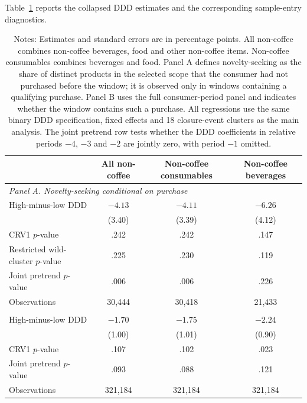 \documentclass[11 pt]{article}
\newcommand\fnote[1]{\captionsetup{font=footnotesize}\caption*{#1}}
\begin{document}
Table~\ref{tab:appendix_noncoffee_novelty} reports the collapsed DDD estimates and the corresponding sample-entry diagnostics.

\begin{table}[!ht]
\centering
\caption{Novelty-Seeking among Non-Coffee Products}
\label{tab:appendix_noncoffee_novelty}
\small
\begin{tabularx}{\textwidth}{Xccc}
\toprule
 & All non-coffee & Non-coffee consumables & Non-coffee beverages \\
\midrule
\multicolumn{4}{l}{\textit{Panel A. Novelty-seeking conditional on purchase}} \\
High-minus-low DDD & $-4.13$ & $-4.11$ & $-6.26$ \\
 & (3.40) & (3.39) & (4.12) \\
CRV1 $p$-value & .242 & .242 & .147 \\
Restricted wild-cluster $p$-value & .225 & .230 & .119 \\
Joint pretrend $p$-value & .006 & .006 & .226 \\
Observations & 30,444 & 30,418 & 21,433 \\
\addlinespace
\multicolumn{4}{l}{\textit{Panel B. Probability of any qualifying purchase}} \\
High-minus-low DDD & $-1.70$ & $-1.75$ & $-2.24$ \\
 & (1.00) & (1.01) & (0.90) \\
CRV1 $p$-value & .107 & .102 & .023 \\
Joint pretrend $p$-value & .093 & .088 & .121 \\
Observations & 321,184 & 321,184 & 321,184 \\
\bottomrule
\end{tabularx}
\vspace{1mm}
\fnote{Notes: Estimates and standard errors are in percentage points. All non-coffee combines non-coffee beverages, food and other non-coffee items. Non-coffee consumables combines beverages and food. Panel A defines novelty-seeking as the share of distinct products in the selected scope that the consumer had not purchased before the window; it is observed only in windows containing a qualifying purchase. Panel B uses the full consumer-period panel and indicates whether the window contains such a purchase. All regressions use the same binary DDD specification, fixed effects and 18 closure-event clusters as the main analysis. The joint pretrend row tests whether the DDD coefficients in relative periods $-4$, $-3$ and $-2$ are jointly zero, with period $-1$ omitted.}
\end{table}
\end{document}
